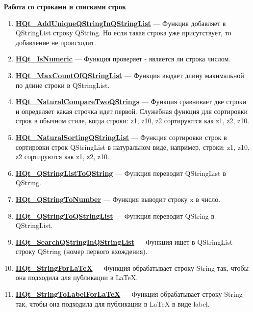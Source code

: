 \documentclass[a4paper,12pt]{article}
\begin{document}
\textbf{Работа со строками и списками строк}
\begin{enumerate}

\item \textbf{\hyperref[HQt_AddUniqueQStringInQStringList]{HQt\_AddUniqueQStringInQStringList}} --- Функция добавляет в QStringList строку QString. Но если такая строка уже присутствует, то добавление не происходит.

\item \textbf{\hyperref[HQt_IsNumeric]{HQt\_IsNumeric}} --- Функция проверяет - является ли строка числом.

\item \textbf{\hyperref[HQt_MaxCountOfQStringList]{HQt\_MaxCountOfQStringList}} --- Функция выдает длину макимальной по длине строки в QStringList.

\item \textbf{\hyperref[HQt_NaturalCompareTwoQStrings]{HQt\_NaturalCompareTwoQStrings}} --- Функция сравнивает две строки и определяет какая строчка идет первой. Служебная функция для сортировки строк в обычном стиле, когда строки: z1, z10, z2 сортируются как z1, z2, z10.

\item \textbf{\hyperref[HQt_NaturalSortingQStringList]{HQt\_NaturalSortingQStringList}} --- Функция сортировки строк в сортировки строк QStringList в натуральном виде, например, строки: z1, z10, z2 сортируются как z1, z2, z10.

\item \textbf{\hyperref[HQt_QStringListToQString]{HQt\_QStringListToQString}} --- Функция переводит QStringList в QString.

\item \textbf{\hyperref[HQt_QStringToNumber]{HQt\_QStringToNumber}} --- Функция выводит строку x в число.

\item \textbf{\hyperref[HQt_QStringToQStringList]{HQt\_QStringToQStringList}} --- Функция переводит QString в QStringList.

\item \textbf{\hyperref[HQt_SearchQStringInQStringList]{HQt\_SearchQStringInQStringList}} --- Функция ищет в QStringList строку QString (номер первого вхождения).

\item \textbf{\hyperref[HQt_StringForLaTeX]{HQt\_StringForLaTeX}} --- Функция обрабатывает строку String так, чтобы она подходила для публикации в LaTeX.

\item \textbf{\hyperref[HQt_StringToLabelForLaTeX]{HQt\_StringToLabelForLaTeX}} --- Функция обрабатывает строку String так, чтобы она подходила для публикации в LaTeX в виде label.


\end{enumerate}
\end{document}
